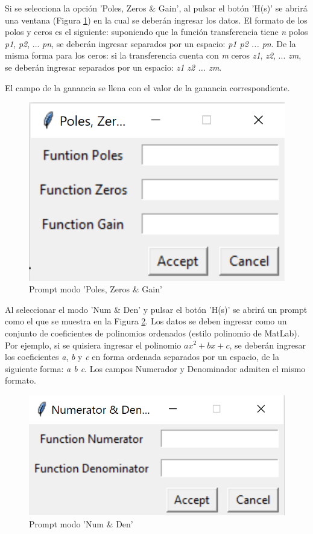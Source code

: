 Si se selecciona la opción 'Poles, Zeros \& Gain', al pulsar el botón 'H(s)' se abrirá una ventana (Figura \ref{fig:pzgPromt}) en la cual se deberán ingresar los datos. El formato de los polos y ceros es el siguiente: suponiendo que la función transferencia tiene \emph{n} polos \emph{p1}, \emph{p2}, ... \emph{pn}, se deberán ingresar separados por un espacio: \emph{p1 p2 ... pn}. De la misma forma para los ceros: si la transferencia cuenta con \emph{m} ceros \emph{z1}, \emph{z2}, ... \emph{zm}, se deberán ingresar separados por un espacio: \emph{z1 z2 ... zm}. 

El campo de la ganancia se llena con el valor de la ganancia correspondiente.

\begin{figure}[ht]
\centering
\includegraphics[scale=0.3]{resources/pzgPrompt.png}
\caption{Prompt modo 'Poles, Zeros \& Gain'}
\label{fig:pzgPromt}
\end{figure}

Al seleccionar el modo 'Num \& Den' y pulsar el botón 'H(s)' se abrirá un prompt como el que se muestra en la Figura \ref{fig:numDenPrompt}. Los datos se deben ingresar como un conjunto de coeficientes de polinomios ordenados (estilo polinomio de MatLab). Por ejemplo, si se quisiera ingresar el polinomio $ax^2 + bx + c$, se deberán ingresar los coeficientes \emph{a}, \emph{b} y \emph{c} en forma ordenada separados por un espacio, de la siguiente forma: \emph{a b c}. Los campos Numerador y Denominador admiten el mismo formato.

\begin{figure}[ht]
\centering
\includegraphics[scale=0.3]{resources/numDenPrompt.png}
\caption{Prompt modo 'Num \& Den'}
\label{fig:numDenPrompt}
\end{figure}

